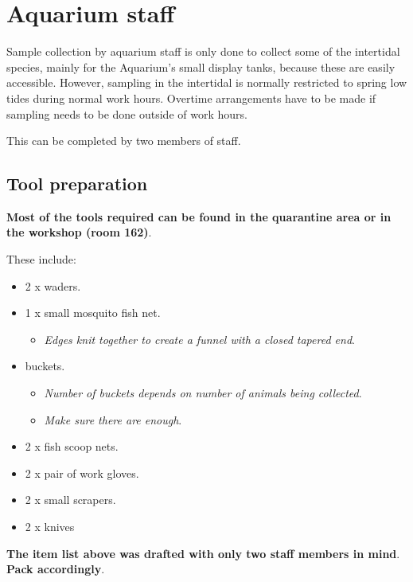\documentclass[
  12pt,
]{report}
\providecommand{\tightlist}{%
  \setlength{\itemsep}{0pt}\setlength{\parskip}{0pt}}\usepackage{longtable,booktabs,array}
\begin{document}
\hypertarget{aquarium-staff}{%
\section{Aquarium staff}\label{aquarium-staff}}

Sample collection by aquarium staff is only done to collect some of the
intertidal species, mainly for the Aquarium's small display tanks,
because these are easily accessible. However, sampling in the intertidal
is normally restricted to spring low tides during normal work hours.
Overtime arrangements have to be made if sampling needs to be done
outside of work hours.

{This can be completed by two members of staff.}

\hypertarget{sec-collect-tool}{%
\subsection{Tool preparation}\label{sec-collect-tool}}

\textbf{Most of the tools required can be found in the quarantine area
or in the workshop (room 162)}.

These include:

\begin{itemize}
\tightlist
\item
  2 x waders.
\item
  1 x small mosquito fish net.

  \begin{itemize}
  \tightlist
  \item
    \emph{Edges knit together to create a funnel with a closed tapered
    end}.
  \end{itemize}
\item
  buckets.

  \begin{itemize}
  \tightlist
  \item
    \emph{Number of buckets depends on number of animals being
    collected}.
  \item
    \emph{Make sure there are enough}.
  \end{itemize}
\item
  2 x fish scoop nets.
\item
  2 x pair of work gloves.
\item
  2 x small scrapers.
\item
  2 x knives
\end{itemize}

\textbf{The item list above was drafted with only two staff members in
mind}. \textbf{Pack accordingly}.
\end{document}

